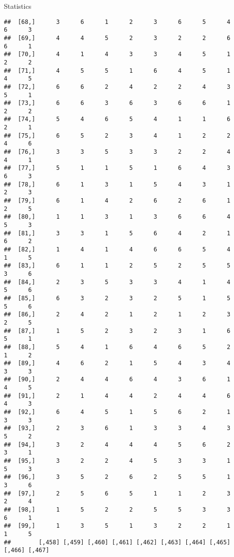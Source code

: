 \documentclass[
  ignorenonframetext,
]{beamer}
\begin{document}
\begin{frame}[fragile]{Statistics}
\begin{verbatim}
##  [68,]      3      6      1      2      3      6      5      4      6      3
##  [69,]      4      4      5      2      3      2      2      6      6      1
##  [70,]      4      1      4      3      3      4      5      1      2      2
##  [71,]      4      5      5      1      6      4      5      1      4      5
##  [72,]      6      6      2      4      2      2      4      3      5      1
##  [73,]      6      6      3      6      3      6      6      1      2      2
##  [74,]      5      4      6      5      4      1      1      6      2      1
##  [75,]      6      5      2      3      4      1      2      2      4      6
##  [76,]      3      3      5      3      3      2      2      4      4      1
##  [77,]      5      1      1      5      1      6      4      3      6      3
##  [78,]      6      1      3      1      5      4      3      1      2      3
##  [79,]      6      1      4      2      6      2      6      1      2      5
##  [80,]      1      1      3      1      3      6      6      4      5      3
##  [81,]      3      3      1      5      6      4      2      1      6      2
##  [82,]      1      4      1      4      6      6      5      4      1      5
##  [83,]      6      1      1      2      5      2      5      5      3      6
##  [84,]      2      3      5      3      3      4      1      4      5      6
##  [85,]      6      3      2      3      2      5      1      5      5      6
##  [86,]      2      4      2      1      2      1      2      3      2      5
##  [87,]      1      5      2      3      2      3      1      6      5      1
##  [88,]      5      4      1      6      4      6      5      2      1      2
##  [89,]      4      6      2      1      5      4      3      4      3      3
##  [90,]      2      4      4      6      4      3      6      1      4      5
##  [91,]      2      1      4      4      2      4      4      6      4      3
##  [92,]      6      4      5      1      5      6      2      1      3      3
##  [93,]      2      3      6      1      3      3      4      3      5      2
##  [94,]      3      2      4      4      4      5      6      2      3      1
##  [95,]      3      2      2      4      5      3      3      1      5      3
##  [96,]      3      5      2      6      2      5      5      1      3      6
##  [97,]      2      5      6      5      1      1      2      3      2      4
##  [98,]      1      5      2      2      5      5      3      3      6      1
##  [99,]      1      3      5      1      3      2      2      1      1      5
##        [,458] [,459] [,460] [,461] [,462] [,463] [,464] [,465] [,466] [,467]

\end{verbatim}
\end{frame}
\end{document}
